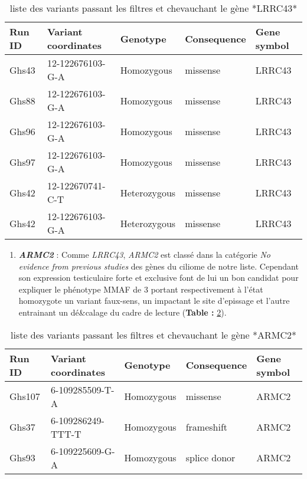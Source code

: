 \documentclass[12pt,twoside]{reedthesis}
\providecommand{\tightlist}{%
  \setlength{\itemsep}{0pt}\setlength{\parskip}{0pt}}
\theoremstyle{definition}
\theoremstyle{definition}
\theoremstyle{remark}
\begin{document}
  \begin{longtable}[t]{lllll}
  \caption{\label{tab:tablrrc43}liste des variants passant les filtres et chevauchant le gène *LRRC43*}\\
  \toprule
  Run ID & Variant coordinates & Genotype & Consequence & Gene symbol\\
  \midrule
  Ghs43 & 12-122676103-G-A & Homozygous & missense & LRRC43\\
  Ghs88 & 12-122676103-G-A & Homozygous & missense & LRRC43\\
  Ghs96 & 12-122676103-G-A & Homozygous & missense & LRRC43\\
  Ghs97 & 12-122676103-G-A & Homozygous & missense & LRRC43\\
  Ghs42 & 12-122670741-C-T & Heterozygous & missense & LRRC43\\
  Ghs42 & 12-122676103-G-A & Heterozygous & missense & LRRC43\\
  \bottomrule
  \end{longtable}
  
  \begin{enumerate}
  \def\labelenumi{\arabic{enumi}.}
  \setcounter{enumi}{3}
  \tightlist
  \item
    \textbf{\emph{ARMC2}} : Comme \emph{LRRC43}, \emph{ARMC2} est classé
    dans la catégorie \emph{No evidence from previous studies} des gènes
    du ciliome de notre liste. Cependant son expression testiculaire forte
    et exclusive font de lui un bon candidat pour expliquer le phénotype
    MMAF de 3 portant respectivement à l'état homozygote un variant
    faux-sens, un impactant le site d'epissage et l'autre entrainant un
    dé\&calage du cadre de lecture (\textbf{Table : }\ref{tab:tabarmc2}).
  \end{enumerate}
  
  \begin{longtable}[t]{lllll}
  \caption{\label{tab:tabarmc2}liste des variants passant les filtres et chevauchant le gène *ARMC2*}\\
  \toprule
  Run ID & Variant coordinates & Genotype & Consequence & Gene symbol\\
  \midrule
  Ghs107 & 6-109285509-T-A & Homozygous & missense & ARMC2\\
  Ghs37 & 6-109286249-TTT-T & Homozygous & frameshift & ARMC2\\
  Ghs93 & 6-109225609-G-A & Homozygous & splice donor & ARMC2\\
  \bottomrule
  \end{longtable}
  
\end{document}
